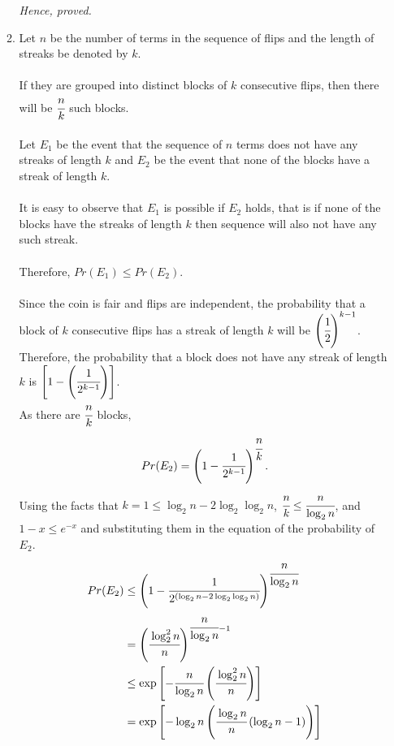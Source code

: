 \documentclass{article}
\begin{document}
\begin{enumerate}
\begin{enumerate}
            \textit{Hence, proved.}
        \newpage
        \item 
            Let \(n\) be the number of terms in the sequence of flips and the length of streaks be denoted by \(k\).\\\\
            If they are grouped into distinct blocks of \(k\) consecutive flips, then there will be \(\cfrac{n}{k}\) such blocks.\\\\
            Let \(E_1\) be the event that the sequence of \(n\) terms does not have any streaks of length \(k\) and \(E_2\) be the event that none of the blocks have a streak of length \(k\).\\\\
            It is easy to observe that \(E_1\) is possible if \(E_2\) holds, that is if none of the blocks have the streaks of length \(k\) then sequence will also not have any such streak.\\\\
            Therefore, \(Pr(E_1) \leq Pr(E_2)\).\\\\
            Since the coin is fair and flips are independent, the probability that a block of \(k\) consecutive flips has a streak of length \(k\) will be \(\left(\cfrac{1}{2}\right)^{k-1}\). Therefore, the probability that a block does not have any streak of length \(k\) is \(\left[1 - \left(\cfrac{1}{2^{k-1}}\right)\right]\).\\
            As there are \(\cfrac{n}{k}\) blocks,
            \[
                Pr(E_2) = \left(1 - \cfrac{1}{2^{k-1}}\right)^{\cfrac{n}{k}}.
            \]            
            Using the facts that \( k = 1 \leq \log_2 n - 2\log_2\log_2 n \), \( \cfrac{n}{k} \leq \cfrac{n}{\log_2 n} \), and \( 1 - x \leq e^{-x} \) and substituting them in the equation of the probability of \( E_2 \).            
            \begin{align*}
                Pr(E_2) &\leq \left(1 - \cfrac{1}{2^{(\log_2 n - 2\log_2\log_2 n)}}\right)^{\cfrac{n}{\log_2 n}}\\
                &= \left(\cfrac{\log_2^2 n}{n}\right)^{\cfrac{n}{\log_2 n}-1}\\
                &\leq \exp\left[-\cfrac{n}{\log_2 n}\left(\cfrac{\log_2^2 n}{n}\right)\right]\\
                &= \exp\left[-\log_2 n \left(\cfrac{\log_2 n}{n} \left(\log_2 n - 1\right)\right)\right]\\

\end{align*}
\end{enumerate}
\end{enumerate}
\end{document}
